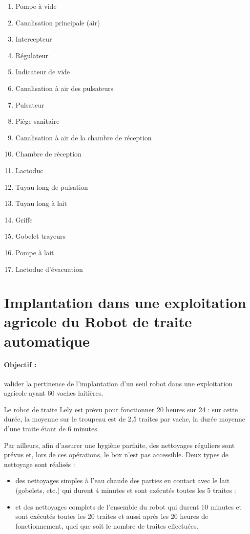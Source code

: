 \begin{minipage}[t]{0.52\linewidth}
\begin{enumerate}
\item Pompe à vide
\item Canalisation principale (air)
\item Intercepteur
\item Régulateur
\item Indicateur de vide
\item Canalisation à air des pulsateurs
\item Pulsateur
\item Piège sanitaire
\item Canalisation à air de la chambre de réception
\end{enumerate}
\end{minipage}
\hfill
\begin{minipage}[t]{0.45\linewidth}
\begin{enumerate}
\setcounter{enumi}{9}
\item Chambre de réception
\item Lactoduc
\item Tuyau long de pulsation
\item Tuyau long à lait
\item Griffe
\item Gobelet trayeurs
\item Pompe à lait
\item Lactoduc d’évacuation
\end{enumerate}
\end{minipage}


\section{Implantation dans une exploitation agricole du \og Robot de traite automatique \fg}

\paragraph{Objectif :} valider la pertinence de l’implantation d’un seul robot dans une exploitation agricole ayant 60 vaches laitières.

Le robot de traite Lely est prévu pour fonctionner 20 heures sur 24 : sur cette durée, la moyenne sur le troupeau est de 2,5 traites par vache, la durée moyenne d’une traite étant de 6 minutes.

Par ailleurs, afin d’assurer une hygiène parfaite, des nettoyages réguliers sont prévus et, lors de ces opérations, le box n’est pas accessible. Deux types de nettoyage sont réalisés :
\begin{itemize}
 \item des nettoyages simples à l’eau chaude des parties en contact avec le lait (gobelets, etc.) qui durent 4 minutes et sont exécutés toutes les 5 traites ;
 \item et des nettoyages complets de l’ensemble du robot qui durent 10 minutes et sont exécutés toutes les 20 traites et aussi après les 20 heures de fonctionnement, quel que soit le nombre de traites effectuées.   
\end{itemize}

